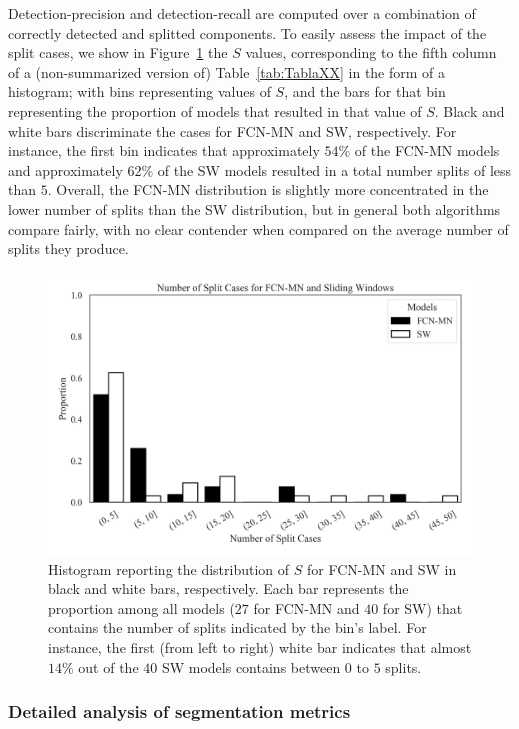 \documentclass[a4paper,authoryear,review]{elsarticle}
\begin{document}
Detection-precision and detection-recall are computed over a combination of correctly detected and splitted components. To easily assess the impact of the split cases, we show in Figure~\ref{fig:number-of-split} the $S$ values, corresponding to the fifth column of a   (non-summarized version of) Table~\ref{tab:TablaXX} in the form of a histogram; with bins representing values of $S$,  and the bars for that bin representing the proportion of models that resulted in that value of $S$. Black and white bars discriminate the cases for FCN-MN and SW, respectively. For instance, the first bin indicates that approximately $54\%$ of the FCN-MN models and approximately $62\%$ of the SW models resulted in a total number splits of less than $5$. Overall, the FCN-MN distribution is slightly more concentrated in the lower number of splits than the SW distribution, but in general both algorithms compare fairly, with no clear contender when compared on the average number of splits they produce. 

\begin{figure}
	\centering
	\includegraphics[width=\textwidth]{figures/PPP_split_distribution.png}
	\caption{Histogram reporting the distribution of $S$ for FCN-MN and SW in black and white bars, respectively. Each bar represents the proportion among all models ($27$ for FCN-MN  and $40$ for SW) that contains the number of splits indicated by the bin’s label. For instance, the first (from left to right) white bar indicates that almost $14\%$ out of the $40$ SW models contains between $0$ to $5$ splits. }
	\label{fig:number-of-split}
\end{figure}

\subsubsection{Detailed analysis of segmentation metrics}
\end{document}
